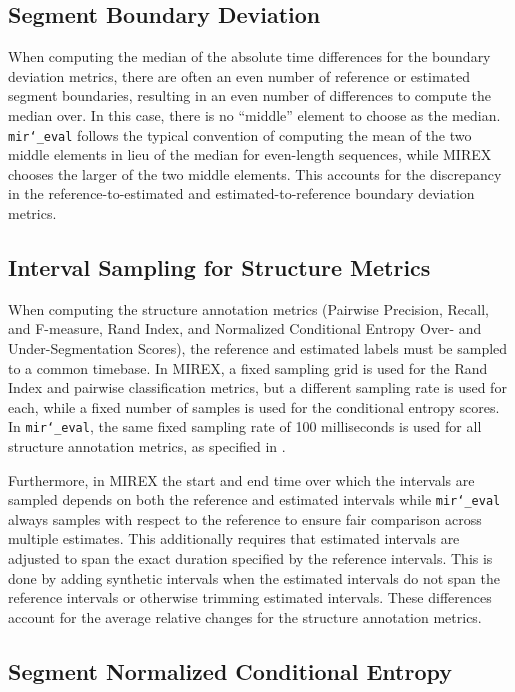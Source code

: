 \documentclass{article}
\def\mireval{\texttt{mir\char`_eval}}
\begin{document}
\subsection{Segment Boundary Deviation}

When computing the median of the absolute time differences for the boundary deviation metrics, there are often an even number of reference or estimated segment boundaries, resulting in an even number of differences to compute the median over.
In this case, there is no ``middle'' element to choose as the median.
\mireval{} follows the typical convention of computing the mean of the two middle elements in lieu of the median for even-length sequences, while MIREX chooses the larger of the two middle elements.
This accounts for the discrepancy in the reference-to-estimated and estimated-to-reference boundary deviation metrics.

\subsection{Interval Sampling for Structure Metrics}

When computing the structure annotation metrics (Pairwise Precision, Recall, and F-measure, Rand Index, and Normalized Conditional Entropy Over- and Under-Segmentation Scores), the reference and estimated labels must be sampled to a common timebase.
In MIREX, a fixed sampling grid is used for the Rand Index and pairwise classification metrics, but a different sampling rate is used for each, while a fixed number of samples is used for the conditional entropy scores.
In \mireval{}, the same fixed sampling rate of 100 milliseconds is used for all structure annotation metrics, as specified in \cite{willis2013mirex}.

Furthermore, in MIREX the start and end time over which the intervals are sampled depends on both the reference and estimated intervals while \mireval{} always samples with respect to the reference to ensure fair comparison across multiple estimates.
This additionally requires that estimated intervals are adjusted to span the exact duration specified by the reference intervals.
This is done by adding synthetic intervals when the estimated intervals do not span the reference intervals or otherwise trimming estimated intervals.
These differences account for the average relative changes for the structure annotation metrics.

\subsection{Segment Normalized Conditional Entropy}
\end{document}
